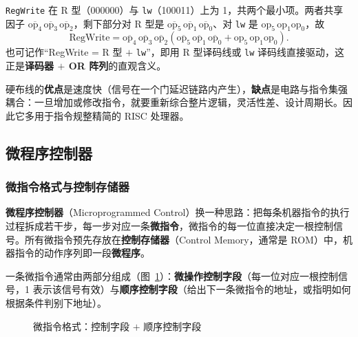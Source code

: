 \begin{example}[化简 RegWrite]
\texttt{RegWrite} 在 R 型（000000）与 \texttt{lw}（100011）上为 1，共两个最小项。两者共享因子 $\overline{\text{op}_4}\,\overline{\text{op}_3}\,\overline{\text{op}_2}$，剩下部分对 R 型是 $\overline{\text{op}_5}\,\overline{\text{op}_1}\,\overline{\text{op}_0}$、对 \texttt{lw} 是 $\text{op}_5\,\text{op}_1\text{op}_0$，故
\[
\text{RegWrite} = \overline{\text{op}_4}\,\overline{\text{op}_3}\,\overline{\text{op}_2}
\left(\overline{\text{op}_5}\,\overline{\text{op}_1}\,\overline{\text{op}_0} + \text{op}_5\,\text{op}_1\text{op}_0\right).
\]
也可记作“RegWrite = R 型 $+$ \texttt{lw}”，即用 R 型译码线或 \texttt{lw} 译码线直接驱动，这正是\textbf{译码器 $+$ OR 阵列}的直观含义。
\end{example}

硬布线的\textbf{优点}是速度快（信号在一个门延迟链路内产生），\textbf{缺点}是电路与指令集强耦合：一旦增加或修改指令，就要重新综合整片逻辑，灵活性差、设计周期长。因此它多用于指令规整精简的 RISC 处理器。

\subsection{微程序控制器}

\subsubsection{微指令格式与控制存储器}

\textbf{微程序控制器}（Microprogrammed Control）换一种思路：把每条机器指令的执行过程拆成若干步，每一步对应一条\textbf{微指令}，微指令的每一位直接决定一根控制信号。所有微指令预先存放在\textbf{控制存储器}（Control Memory，通常是 ROM）中，机器指令的动作序列即一段\textbf{微程序}。

一条微指令通常由两部分组成（图~\ref{fig:microformat}）：\textbf{微操作控制字段}（每一位对应一根控制信号，1 表示该信号有效）与\textbf{顺序控制字段}（给出下一条微指令的地址，或指明如何根据条件判别下地址）。

\begin{figure}[H]
\centering
{}
\caption{微指令格式：控制字段 $+$ 顺序控制字段}
\label{fig:microformat}
\end{figure}

